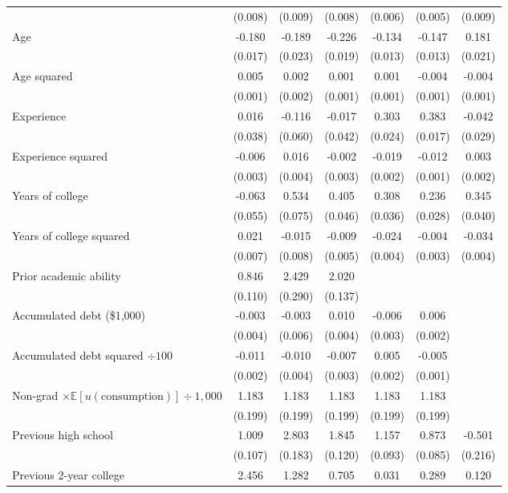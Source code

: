 \begin{landscape}
\begin{ThreePartTable}
\begin{longtable}{lcccccc}
 & (0.008) & (0.009) & (0.008) & (0.006) & (0.005) & (0.009) \\ 
Age & -0.180 & -0.189 & -0.226 & -0.134 & -0.147 & 0.181 \\ 
 & (0.017) & (0.023) & (0.019) & (0.013) & (0.013) & (0.021) \\ 
Age squared & 0.005 & 0.002 & 0.001 & 0.001 & -0.004 & -0.004 \\ 
 & (0.001) & (0.002) & (0.001) & (0.001) & (0.001) & (0.001) \\ 
Experience & 0.016 & -0.116 & -0.017 & 0.303 & 0.383 & -0.042 \\ 
 & (0.038) & (0.060) & (0.042) & (0.024) & (0.017) & (0.029) \\ 
Experience squared & -0.006 & 0.016 & -0.002 & -0.019 & -0.012 & 0.003 \\ 
 & (0.003) & (0.004) & (0.003) & (0.002) & (0.001) & (0.002) \\ 
Years of college & -0.063 & 0.534 & 0.405 & 0.308 & 0.236 & 0.345 \\ 
 & (0.055) & (0.075) & (0.046) & (0.036) & (0.028) & (0.040) \\ 
Years of college squared & 0.021 & -0.015 & -0.009 & -0.024 & -0.004 & -0.034 \\ 
 & (0.007) & (0.008) & (0.005) & (0.004) & (0.003) & (0.004) \\ 
Prior academic ability & 0.846 & 2.429 & 2.020 &  &  &  \\ 
 & (0.110) & (0.290) & (0.137) &  &  &  \\ 
Accumulated debt (\$1,000) & -0.003 & -0.003 & 0.010 & -0.006 & 0.006 &  \\ 
 & (0.004) & (0.006) & (0.004) & (0.003) & (0.002) &  \\ 
Accumulated debt squared $\div 100$ & -0.011 & -0.010 & -0.007 & 0.005 & -0.005 &  \\ 
 & (0.002) & (0.004) & (0.003) & (0.002) & (0.001) &  \\ 
Non-grad $\times\mathbb{E}[u(\text{consumption})] \div 1,000$ & 1.183 & 1.183 & 1.183 & 1.183 & 1.183 &  \\ 
 & (0.199) & (0.199) & (0.199) & (0.199) & (0.199) &  \\ 
Previous high school & 1.009 & 2.803 & 1.845 & 1.157 & 0.873 & -0.501 \\ 
 & (0.107) & (0.183) & (0.120) & (0.093) & (0.085) & (0.216) \\ 
Previous 2-year college & 2.456 & 1.282 & 0.705 & 0.031 & 0.289 & 0.120 \\ 

\end{longtable}
\end{ThreePartTable}
\end{landscape}
